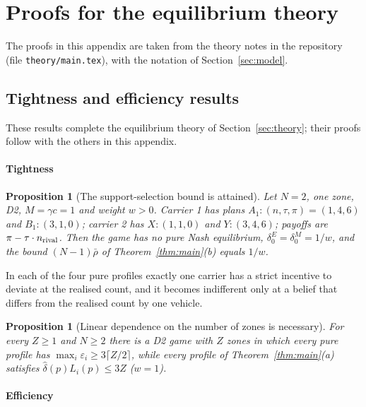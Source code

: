 \documentclass[preprint,11pt]{elsarticle}
\newtheorem{proposition}[theorem]{Proposition}
\theoremstyle{definition}
\theoremstyle{remark}
\begin{document}
\section{Proofs for the equilibrium theory}\label{app:proofs}

The proofs in this appendix are taken from the theory notes in the repository (file \texttt{theory/main.tex}), with the notation of Section~\ref{sec:model}.

\subsection{Tightness and efficiency results}\label{app:tightness}

These results complete the equilibrium theory of Section~\ref{sec:theory}; their proofs follow with the others in this appendix.

\paragraph{Tightness}

\begin{proposition}[The support-selection bound is attained]\label{prop:tight}
Let $N=2$, one zone, D2, $M=\gamma c=1$ and weight $w>0$. Carrier 1 has plans $A_1:(n,\tau,\pi)=(1,4,6)$ and $B_1:(3,1,0)$; carrier 2 has $X:(1,1,0)$ and $Y:(3,4,6)$; payoffs are $\pi-\tau\cdot n_{\rm rival}$. Then the game has no pure Nash equilibrium, $\delta_0^E=\delta_0^M=1/w$, and the bound $(N-1)\bar\rho$ of Theorem~\ref{thm:main}(b) equals $1/w$.
\end{proposition}

In each of the four pure profiles exactly one carrier has a strict incentive to deviate at the realised count, and it becomes indifferent only at a belief that differs from the realised count by one vehicle.

\begin{proposition}[Linear dependence on the number of zones is necessary]\label{prop:cycles}
For every $Z\ge1$ and $N\ge2$ there is a D2 game with $Z$ zones in which every pure profile has $\max_i\varepsilon_i\ge3\lceil Z/2\rceil$, while every profile of Theorem~\ref{thm:main}(a) satisfies $\hat\delta(p)L_i(p)\le3Z$ ($w=1$).
\end{proposition}

\paragraph{Efficiency}
\end{document}
